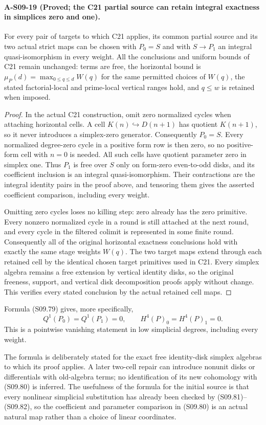 \paragraph{A-S09-19 (Proved; the C21 partial source can retain integral exactness in simplices zero and one).}
For every pair of targets to which C21 applies, its
common partial source and its two actual strict maps
can be chosen with $P_0=S$ and with
$S\to P_1$ an integral quasi-isomorphism in every
weight.  All the conclusions and uniform bounds of
C21 remain unchanged: terms are free, the horizontal
bound is $\mu_P(d)=\max_{0\leq q\leq d}W(q)$ for
the same permitted choices of $W(q)$, the stated
factorial-local and prime-local vertical ranges
hold, and $q\leq w$ is retained when imposed.

\begin{proof}
In the actual C21 construction, omit zero normalized
cycles when attaching horizontal cells.  A cell
$K(n)\hookrightarrow D(n+1)$ has quotient $K(n+1)$,
so it never introduces a simplex-zero generator.
Consequently $P_0=S$.  Every normalized degree-zero
cycle in a positive form row is then zero, so no
positive-form cell with $n=0$ is needed.  All such
cells have quotient parameter zero in simplex one.
Thus $P_1$ is free over $S$ only on form-zero
even-to-odd disks, and its coefficient inclusion
is an integral quasi-isomorphism.  Their contractions
are the integral identity pairs in the proof above,
and tensoring them gives the asserted coefficient
comparison, including every weight.

Omitting zero cycles loses no killing step: zero
already has the zero primitive.  Every nonzero
normalized cycle in a round is still attached at
the next round, and every cycle in the filtered
colimit is represented in some finite round.
Consequently all of the original horizontal
exactness conclusions hold with exactly the same
stage weights $W(q)$.  The two target maps extend
through each retained cell by the identical
chosen target primitives used in C21.  Every
simplex algebra remains a free extension by
vertical identity disks, so the original freeness,
support, and vertical disk decomposition proofs
apply without change.  This verifies every stated
conclusion by the actual retained cell maps.
\end{proof}

Formula (S09.79)
gives, more specifically,
\[
                  Q^1(P_0)=Q^1(P_1)=0,
             \qquad H^4(P)_0=H^4(P)_1=0.            \tag{S09.84}
\]
This is a pointwise vanishing statement in low
simplicial degrees, including every weight.

The formula is deliberately stated for the exact
free identity-disk simplex algebras to which its
proof applies.  A later two-cell repair can introduce
nonunit disks or differentials with old-algebra
terms; no identification of its new cohomology
with (S09.80) is inferred.  The usefulness of the
formula for the initial source is that every
nonlinear simplicial substitution has already been
checked by (S09.81)--(S09.82), so the coefficient
and parameter comparison in (S09.80) is an actual
natural map rather than a choice of linear coordinates.
